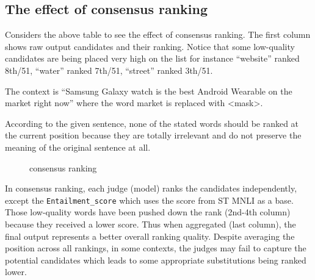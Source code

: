 \documentclass[12pt,oneside,openright,a4paper]{cpe-english-project}
\begin{document}
\subsection{The effect of consensus ranking}

Considers the above table to see the effect of consensus ranking. The first column shows raw output candidates and their ranking. Notice that some low-quality candidates are being placed very high on the list for instance “website” ranked 8th/51, “water” ranked 7th/51, “street” ranked 3th/51. 

The context is “Samsung Galaxy watch is the best Android Wearable on the market right now” where the word market is replaced with <mask>. 

According to the given sentence, none of the stated words should be ranked at the current position because they are totally irrelevant and do not preserve the meaning of the original sentence at all.

\begin{figure}[!h]\centering
\setlength{\fboxrule}{0.2mm} %
\setlength{\fboxsep}{1cm}
\caption{consensus ranking}\label{fig:consensus ranking}
\end{figure}

In consensus ranking, each judge (model) ranks the candidates independently, except the \verb/Entailment_score/ which uses the score from ST MNLI as a base. Those low-quality words have been pushed down the rank (2nd-4th column) because they received a lower score. Thus when aggregated (last column), the final output represents a better overall ranking quality. Despite averaging the position across all rankings, in some contexts, the judges may fail to capture the potential candidates which leads to some appropriate substitutions being ranked lower.
\end{document}
